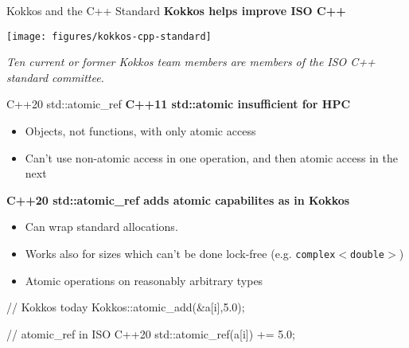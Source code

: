 \begin{frame}[fragile]{Kokkos and the C++ Standard}
  \textbf{Kokkos helps improve ISO C++}


	\vspace{-25pt}
\begin{center}                                                                                                                                    \texttt{[image: figures/kokkos-cpp-standard]}
\end{center}

	\vspace{-25pt}
\textit{Ten current or former Kokkos team members are members of the ISO C++ standard committee.}
\end{frame}

\iffull
\begin{frame}[fragile]{C++20 std::atomic\_ref}
	\textbf{C++11 std::atomic insufficient for HPC}
	\begin{itemize}
           \item Objects, not functions, with only atomic access
	   \item Can't use non-atomic access in one operation, and then atomic access in the next
	\end{itemize}

	\textbf{C++20 std::atomic\_ref adds atomic capabilites as in Kokkos}
	\begin{itemize}
		\item Can wrap standard allocations.
		\item Works also for sizes which can't be done lock-free (e.g. \texttt{complex$<$double$>$})
		\item Atomic operations on reasonably arbitrary types
	\end{itemize}

  \begin{code}[linebackgroundcolor={
      },
      keywords={atomic_add,atomic_ref}, frame=single
    ]
// Kokkos today
Kokkos::atomic_add(&a[i],5.0);

// atomic_ref in ISO C++20
std::atomic_ref(a[i]) += 5.0;
  \end{code}
\end{frame}
\fi

